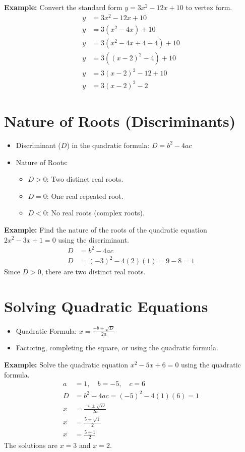 \documentclass{article}
\begin{document}
\textbf{Example:}
Convert the standard form $y = 3x^2 - 12x + 10$ to vertex form.
\begin{align*}
  y &= 3x^2 - 12x + 10 \\
  y &= 3(x^2 - 4x) + 10 \\
  y &= 3(x^2 - 4x + 4 - 4) + 10 \\
  y &= 3((x-2)^2 - 4) + 10 \\
  y &= 3(x-2)^2 - 12 + 10 \\
  y &= 3(x-2)^2 - 2
\end{align*}

\section{Nature of Roots (Discriminants)}
\begin{itemize}
  \item Discriminant ($D$) in the quadratic formula: $D = b^2 - 4ac$
  \item Nature of Roots:
  \begin{itemize}
    \item $D > 0$: Two distinct real roots.
    \item $D = 0$: One real repeated root.
    \item $D < 0$: No real roots (complex roots).
  \end{itemize}
\end{itemize}

\textbf{Example:}
Find the nature of the roots of the quadratic equation $2x^2 - 3x + 1 = 0$ using the discriminant.
\begin{align*}
  D &= b^2 - 4ac \\
  D &= (-3)^2 - 4(2)(1) = 9 - 8 = 1
\end{align*}
Since $D > 0$, there are two distinct real roots.

\section{Solving Quadratic Equations}
\begin{itemize}
  \item Quadratic Formula: $x = \frac{-b \pm \sqrt{D}}{2a}$
  \item Factoring, completing the square, or using the quadratic formula.
\end{itemize}

\textbf{Example:}
Solve the quadratic equation $x^2 - 5x + 6 = 0$ using the quadratic formula.
\begin{align*}
  a &= 1, \quad b = -5, \quad c = 6 \\
  D &= b^2 - 4ac = (-5)^2 - 4(1)(6) = 1 \\
  x &= \frac{-b \pm \sqrt{D}}{2a} \\
  x &= \frac{5 \pm \sqrt{1}}{2} \\
  x &= \frac{5 \pm 1}{2}
\end{align*}
The solutions are $x = 3$ and $x = 2$.
\end{document}

